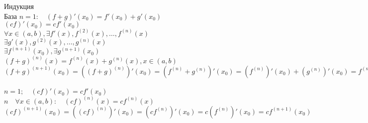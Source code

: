     \begin{replacementproof}
        Индукция\\
        База $n=1: \quad (f+g)'(x_0)=f'(x_0)+g'(x_0)$\\
        $(cf)'(x_0)=cf'(x_0)$\\
        $\forall x \in (a,b), \exists f'(x), f^{(2)}(x), \ldots, f^{(n)}(x)$ \\
        $\exists g'(x), g^{(2)}(x),\ldots,g^{(n)}(x)$ \\
        $\exists f^{(n+1)}(x_0), \exists g^{(n+1)}(x_0)$ \\
        $(f+g)^{(n)}(x)=f^{(n)}(x)+g^{(n)}(x), x \in (a,b)$ \\
        $(f+g)^{(n+1)}(x_0)=((f+g)^{(n)})'(x_0)=(f^{(n)}+g^{(n)})'(x_0)=(f^{(n)})'(x_0)+(g^{(n)})'(x_0)=f^{(n+1)}(x_0)+g^{(n+1)}(x_0)$\\
        \\
        $n=1; \quad (cf)'(x_0)=cf'(x_0)$ \\
        $n \quad \forall x \in (a,b): \quad (cf)^{(n)}(x)=cf^{(n)}(x)$ \\
        $(cf)^{(n+1)}(x_0)=((cf)^{(n)})'(x_0)=(cf^{(n)})'(x_0)=c(f^{(n)})'(x_0)=cf^{(n+1)}(x_0)$
    \end{replacementproof}